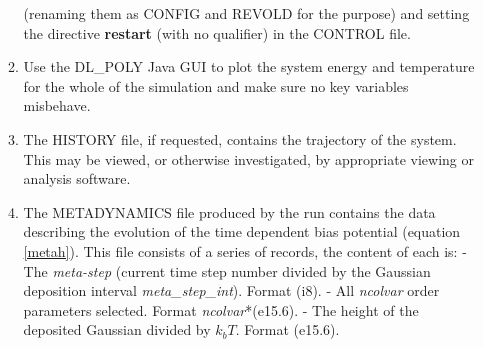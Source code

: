 \begin{enumerate}
\begin{enumerate}
  (renaming them as CONFIG and REVOLD for the purpose) and
  setting the directive {\bf restart} (with no qualifier) in the CONTROL
  file.
\item Use the DL\_POLY Java GUI to plot the system energy and temperature
  for the whole of the simulation and make sure no key variables misbehave.
\item The HISTORY file, if requested, contains the trajectory of the
  system. This may be viewed, or otherwise investigated, by appropriate viewing
  or analysis software.
\item The METADYNAMICS file produced by the run contains the data describing
  the evolution of the time dependent bias potential (equation \ref{metah}).
  This file consists of a series of records, the content of each is:\newline
  - The {\em meta-step} (current time step number divided by the Gaussian 
  deposition interval {\em meta\_step\_int}). Format (i8).\newline
  - All {\em ncolvar} order parameters selected. Format {\em ncolvar}*(e15.6).\newline
  - The height of the deposited Gaussian divided by $k_{b}T$. Format (e15.6).
\end{enumerate}
  
\end{enumerate}

